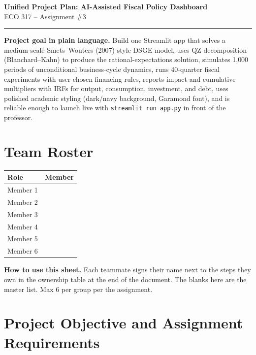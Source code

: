 \documentclass[11pt]{article}
\newcommand{\nameblank}{\underline{\hspace{4.5cm}}}
\begin{document}
\begin{center}
    {\LARGE \textbf{Unified Project Plan: AI-Assisted Fiscal Policy Dashboard}}\\[0.4em]
    {\large ECO 317 -- Assignment \#3}\\[0.4em]
    \rule{0.9\linewidth}{0.5pt}
\end{center}

\begin{goalbox}
\textbf{Project goal in plain language.} Build one Streamlit app that solves a medium-scale Smets--Wouters (2007) style DSGE model, uses QZ decomposition (Blanchard--Kahn) to produce the rational-expectations solution, simulates 1{,}000 periods of unconditional business-cycle dynamics, runs 40-quarter fiscal experiments with user-chosen financing rules, reports impact and cumulative multipliers with IRFs for output, consumption, investment, and debt, uses polished academic styling (dark/navy background, Garamond font), and is reliable enough to launch live with \texttt{streamlit run app.py} in front of the professor.
\end{goalbox}

\section{Team Roster}

\begin{tabularx}{\linewidth}{@{}p{3.5cm}X@{}}
\toprule
\textbf{Role} & \textbf{Member} \\
\midrule
Member 1 & \nameblank \\
Member 2 & \nameblank \\
Member 3 & \nameblank \\
Member 4 & \nameblank \\
Member 5 & \nameblank \\
Member 6 & \nameblank \\
\bottomrule
\end{tabularx}

\begin{notebox}
\textbf{How to use this sheet.} Each teammate signs their name next to the steps they own in the ownership table at the end of the document. The blanks here are the master list. Max 6 per group per the assignment.
\end{notebox}

\section{Project Objective and Assignment Requirements}
\end{document}

